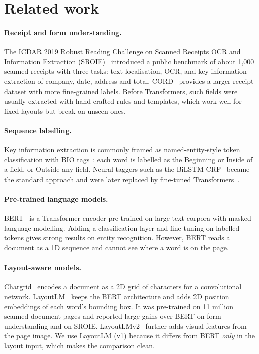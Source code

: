 
\section{Related work}
\label{sec:related}

\paragraph{Receipt and form understanding.} The ICDAR 2019 Robust
Reading Challenge on Scanned Receipts OCR and Information Extraction
(SROIE)~\cite{huang2019sroie} introduced a public benchmark of about
1{,}000 scanned receipts with three tasks: text localisation, OCR, and
key information extraction of company, date, address and total.
CORD~\cite{park2019cord} provides a larger receipt dataset with more
fine-grained labels. Before Transformers, such fields were usually
extracted with hand-crafted rules and templates, which work well for
fixed layouts but break on unseen ones.

\paragraph{Sequence labelling.} Key information extraction is commonly
framed as named-entity-style token classification with BIO
tags~\cite{ramshaw1995text}: each word is labelled as the Beginning or
Inside of a field, or Outside any field. Neural taggers such as the
BiLSTM-CRF~\cite{lample2016ner} became the standard approach and were
later replaced by fine-tuned Transformers~\cite{vaswani2017attention}.

\paragraph{Pre-trained language models.} BERT~\cite{devlin2019bert} is a
Transformer encoder pre-trained on large text corpora with masked
language modelling. Adding a classification layer and fine-tuning on
labelled tokens gives strong results on entity recognition. However,
BERT reads a document as a 1D sequence and cannot see where a word is on
the page.

\paragraph{Layout-aware models.} Chargrid~\cite{katti2018chargrid}
encodes a document as a 2D grid of characters for a convolutional
network. LayoutLM~\cite{xu2020layoutlm} keeps the BERT architecture and
adds 2D position embeddings of each word's bounding box. It was
pre-trained on 11 million scanned document pages and reported large
gains over BERT on form understanding and on SROIE.
LayoutLMv2~\cite{xu2021layoutlmv2} further adds visual features from the
page image. We use LayoutLM (v1) because it differs from BERT
\emph{only} in the layout input, which makes the comparison clean.
